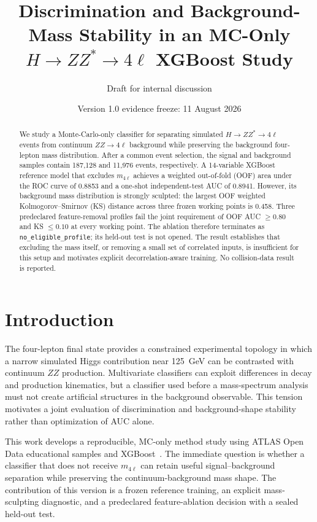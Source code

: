 \documentclass[11pt]{article}
\title{Discrimination and Background-Mass Stability in an MC-Only\\$H\to ZZ^{*}\to4\ell$ XGBoost Study}
\author{Draft for internal discussion}
\date{Version 1.0 evidence freeze: 11 August 2026}
\begin{document}
\maketitle

\begin{abstract}
We study a Monte-Carlo-only classifier for separating simulated $H\to ZZ^{*}\to4\ell$ events from continuum $ZZ\to4\ell$ background while preserving the background four-lepton mass distribution. After a common event selection, the signal and background samples contain 187,128 and 11,976 events, respectively. A 14-variable XGBoost reference model that excludes $m_{4\ell}$ achieves a weighted out-of-fold (OOF) area under the ROC curve of 0.8853 and a one-shot independent-test AUC of 0.8941. However, its background mass distribution is strongly sculpted: the largest OOF weighted Kolmogorov--Smirnov (KS) distance across three frozen working points is 0.458. Three predeclared feature-removal profiles fail the joint requirement of OOF AUC $\geq0.80$ and KS $\leq0.10$ at every working point. The ablation therefore terminates as \texttt{no\_eligible\_profile}; its held-out test is not opened. The result establishes that excluding the mass itself, or removing a small set of correlated inputs, is insufficient for this setup and motivates explicit decorrelation-aware training. No collision-data result is reported.
\end{abstract}

\section{Introduction}

The four-lepton final state provides a constrained experimental topology in which a narrow simulated Higgs contribution near 125~GeV can be contrasted with continuum $ZZ$ production. Multivariate classifiers can exploit differences in decay and production kinematics, but a classifier used before a mass-spectrum analysis must not create artificial structures in the background observable. This tension motivates a joint evaluation of discrimination and background-shape stability rather than optimization of AUC alone.

This work develops a reproducible, MC-only method study using ATLAS Open Data educational samples and XGBoost~\cite{atlasopendata2025,atlasmetadata2025,chen2016xgboost}. The immediate question is whether a classifier that does not receive $m_{4\ell}$ can retain useful signal--background separation while preserving the continuum-background mass shape. The contribution of this version is a frozen reference training, an explicit mass-sculpting diagnostic, and a predeclared feature-ablation decision with a sealed held-out test.
\end{document}
